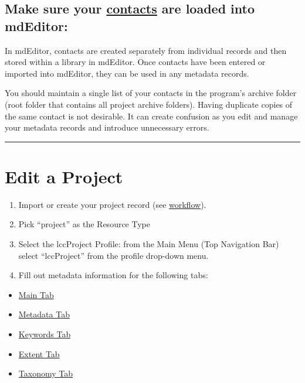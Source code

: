 \documentclass[
]{book}
\providecommand{\tightlist}{%
  \setlength{\itemsep}{0pt}\setlength{\parskip}{0pt}}
\begin{document}
\hypertarget{make-sure-your-contacts-are-loaded-into-mdeditor}{%
\subsection{\texorpdfstring{Make sure your \protect\hyperlink{contact_entry_guidance}{contacts} are loaded into mdEditor:}{Make sure your contacts are loaded into mdEditor:}}\label{make-sure-your-contacts-are-loaded-into-mdeditor}}

In mdEditor, contacts are created separately from individual records and then stored within a library in mdEditor. Once contacts have been entered or imported into mdEditor, they can be used in any metadata records.

You should maintain a single list of your contacts in the program's archive folder (root folder that contains all project archive folders). Having duplicate copies of the same contact is not desirable. It can create confusion as you edit and manage your metadata records and introduce unnecessary errors.

\begin{center}\rule{0.5\linewidth}{\linethickness}\end{center}

\hypertarget{edit-a-project}{%
\section{Edit a Project}\label{edit-a-project}}

\begin{enumerate}
\def\labelenumi{\arabic{enumi}.}
\tightlist
\item
  Import or create your project record (see \protect\hyperlink{workflow}{workflow}).
\item
  Pick ``project'' as the Resource Type
\item
  Select the lccProject Profile: from the Main Menu (Top Navigation Bar) select ``lccProject'' from the profile drop-down menu.
\item
  Fill out metadata information for the following tabs:
\end{enumerate}

\begin{itemize}
\tightlist
\item
  \protect\hyperlink{project-main}{Main Tab}
\item
  \protect\hyperlink{project-metadata}{Metadata Tab}
\item
  \protect\hyperlink{project-keywords}{Keywords Tab}
\item
  \protect\hyperlink{project-extent}{Extent Tab}
\item
  \protect\hyperlink{project-taxonomy}{Taxonomy Tab}
\end{itemize}
\end{document}
